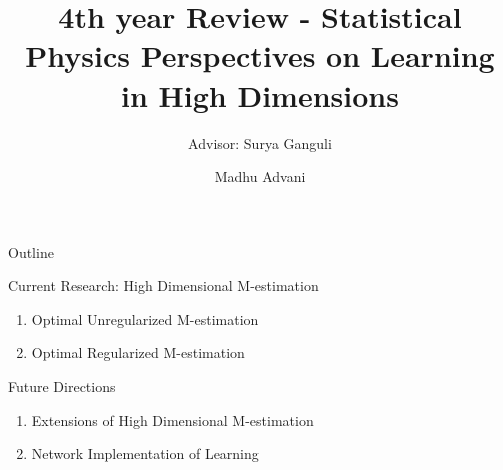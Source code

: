 \documentclass[pdf]{beamer}
\title[Physics of Learning]{4th year Review - Statistical Physics Perspectives on Learning in High Dimensions}
\subtitle{Advisor: Surya Ganguli}
\author{Madhu Advani}
\institute{Stanford University}
\begin{document}
\begin{frame}
    \titlepage
\end{frame}

\begin{frame}{Outline}
\begin{block}{Current Research: High Dimensional M-estimation}
\begin{enumerate}
\vspace{.1in}
\item Optimal Unregularized M-estimation
\vspace{.1in}
\item Optimal Regularized M-estimation
\end{enumerate}
\end{block}

\vspace{.1in}
\begin{block}{Future Directions}
    \begin{enumerate}
    \vspace{.1in}
        \item Extensions of High Dimensional M-estimation
        \vspace{.1in}
        \item Network Implementation of Learning
    \end{enumerate}
\end{block}
\end{frame}
\end{document}
